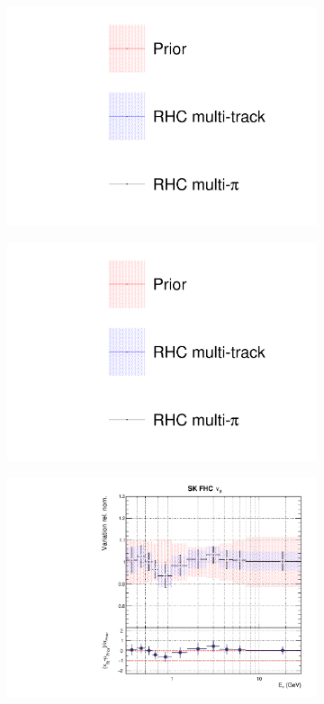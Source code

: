 \begin{figure}[t]
\centering
\begin{subfigure}{0.3\textwidth}
  \centering
  \includegraphics[width=1.0\linewidth, trim={5mm  130mm 0mm 10mm}, clip]{figs/rhcmpdat248_leg}	
\end{subfigure}
\begin{subfigure}{0.3\textwidth}
  \centering
  \includegraphics[width=1.0\linewidth, trim={5mm  0mm 0mm 70mm}, clip]{figs/rhcmpdat248_leg}	
\end{subfigure}
\begin{subfigure}{0.45\textwidth}
  \centering
  \includegraphics[width=0.75\linewidth]{figs/rhcmpdat248flux_8}

\end{subfigure}
\end{figure}
